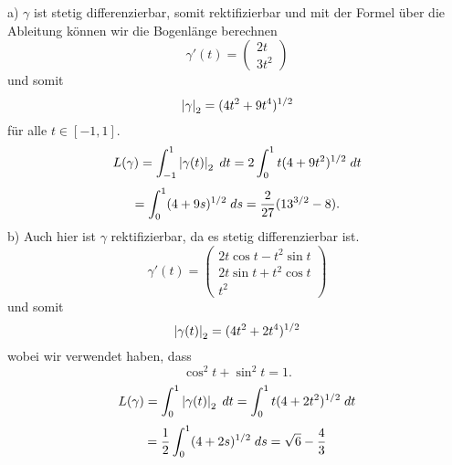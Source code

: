 \documentclass[../ana2u.tex]{subfiles}
\begin{document}
\begin{bew}
    a) \(\gamma\) ist stetig differenzierbar, somit rektifizierbar und mit der
    Formel über die Ableitung können wir die Bogenlänge berechnen
    \[ \gamma'(t) = \begin{pmatrix} 2t \\ 3t^2 \end{pmatrix} \]
    und somit 
    \[ \abs{\gamma}_2 = (4 t^2 + 9 t^4)^{1/2} \]
    für alle \( t \in [-1,1] \).
    \[ L(\gamma) = \integralx{\abs{\gamma(t)}_2 }{-1}{1}{t} 
    = 2 \integralx{ t (4 + 9t^2)^{1/2} }{0}{1}{t} \]
    \[ = \integralx{ (4 + 9s)^{1/2} }{0}{1}{s} = \frac{2}{27} (13^{3/2} - 8). \]
    b) Auch hier ist \( \gamma \) rektifizierbar, da es stetig differenzierbar ist.
    \[ \gamma'(t) = \begin{pmatrix}
        2 t \cos t - t^2 \sin t \\
        2 t \sin t + t^2 \cos t \\
        t^2
    \end{pmatrix} \]
    und somit 
    \[ \abs{\gamma(t)}_2 = (4t^2 + 2t^4)^{1/2} \] 
    wobei wir verwendet haben, dass 
    \[ \cos^2 t + \sin^2 t = 1. \]
    \[ L(\gamma) = \integralx{\abs{\gamma(t)}_2}{0}{1}{t} = \integralx{t(4 + 2t^2)^{1/2}}{0}{1}{t} \]
    \[ = \frac{1}{2} \integralx{(4 + 2s)^{1/2}}{0}{1}{s} 
    = \sqrt{6} - \frac{4}{3} \]
\end{bew}
\end{document}
